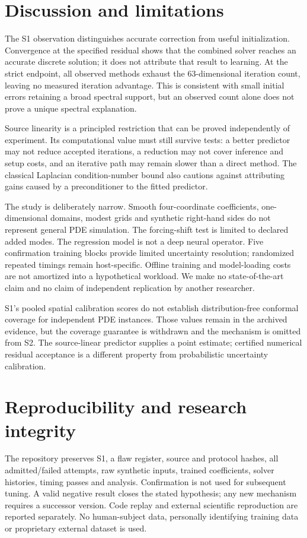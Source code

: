 \section{Discussion and limitations}
The S1 observation distinguishes accurate correction from useful initialization. Convergence at the specified residual shows that the combined solver reaches an accurate discrete solution; it does not attribute that result to learning. At the strict endpoint, all observed methods exhaust the 63-dimensional iteration count, leaving no measured iteration advantage. This is consistent with small initial errors retaining a broad spectral support, but an observed count alone does not prove a unique spectral explanation.

Source linearity is a principled restriction that can be proved independently of experiment. Its computational value must still survive tests: a better predictor may not reduce accepted iterations, a reduction may not cover inference and setup costs, and an iterative path may remain slower than a direct method. The classical Laplacian condition-number bound also cautions against attributing gains caused by a preconditioner to the fitted predictor.

The study is deliberately narrow. Smooth four-coordinate coefficients, one-dimensional domains, modest grids and synthetic right-hand sides do not represent general PDE simulation. The forcing-shift test is limited to declared added modes. The regression model is not a deep neural operator. Five confirmation training blocks provide limited uncertainty resolution; randomized repeated timings remain host-specific. Offline training and model-loading costs are not amortized into a hypothetical workload. We make no state-of-the-art claim and no claim of independent replication by another researcher.

S1's pooled spatial calibration scores do not establish distribution-free conformal coverage for independent PDE instances. Those values remain in the archived evidence, but the coverage guarantee is withdrawn and the mechanism is omitted from S2. The source-linear predictor supplies a point estimate; certified numerical residual acceptance is a different property from probabilistic uncertainty calibration.

\section{Reproducibility and research integrity}
The repository preserves S1, a flaw register, source and protocol hashes, all admitted/failed attempts, raw synthetic inputs, trained coefficients, solver histories, timing passes and analysis. Confirmation is not used for subsequent tuning. A valid negative result closes the stated hypothesis; any new mechanism requires a successor version. Code replay and external scientific reproduction are reported separately. No human-subject data, personally identifying training data or proprietary external dataset is used.

